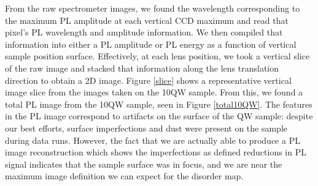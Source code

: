 \indent From the raw spectrometer images, we found the wavelength corresponding to the maximum PL amplitude at each vertical CCD maximum and read that pixel's PL wavelength and amplitude information. We then compiled that information into either a PL amplitude or PL energy as a function of vertical sample position surface. Effectively, at each lens position, we took a vertical slice of the raw image and stacked that information along the lens translation direction to obtain a 2D image. Figure \ref{slice} shows a representative vertical image slice from the images taken on the 10QW sample. From this, we found a total PL image from the 10QW sample, seen in Figure \ref{total10QW}. The features in the PL image correspond to artifacts on the surface of the QW sample: despite our best efforts, surface imperfections and dust were present on the sample during data runs. However, the fact that we are actually able to produce a PL image reconstruction which shows the imperfections as defined reductions in PL signal indicates that the sample surface was in focus, and we are near the maximum image definition we can expect for the disorder map. 

